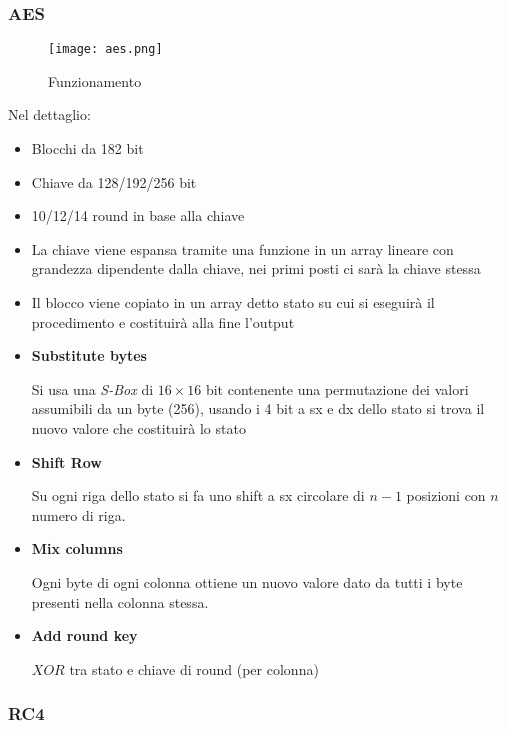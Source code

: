 \documentclass{article}
\begin{document}
\subsubsection{AES}

\begin{figure}[H]
    \centering
    \texttt{[image: aes.png]}
    \caption{Funzionamento}
\end{figure}

\noindent Nel dettaglio:
\begin{itemize}
    \item Blocchi da 182 bit
    \item Chiave da 128/192/256 bit
    \item 10/12/14 round in base alla chiave

\newpage

    \item La chiave viene espansa tramite una funzione in un array lineare con grandezza dipendente dalla chiave, nei primi posti ci sarà la chiave stessa

    \item Il blocco viene copiato in un array detto stato su cui si eseguirà il procedimento e costituirà alla fine l'output

    \item \textbf{Substitute bytes}

        Si usa una \textit{S-Box} di $16\times16$ bit contenente una permutazione dei valori assumibili da un byte (256), usando i 4 bit a sx e dx dello stato si trova il nuovo valore che costituirà lo stato

    \item \textbf{Shift Row}

        Su ogni riga dello stato si fa uno shift a sx circolare di $n-1$ posizioni con $n$ numero di riga.

    \item \textbf{Mix columns}

        Ogni byte di ogni colonna ottiene un nuovo valore dato da tutti i byte presenti nella colonna stessa.

    \item \textbf{Add round key}

        $XOR$ tra stato e chiave di round (per colonna)
        
\end{itemize}

\subsubsection{RC4}
\end{document}
